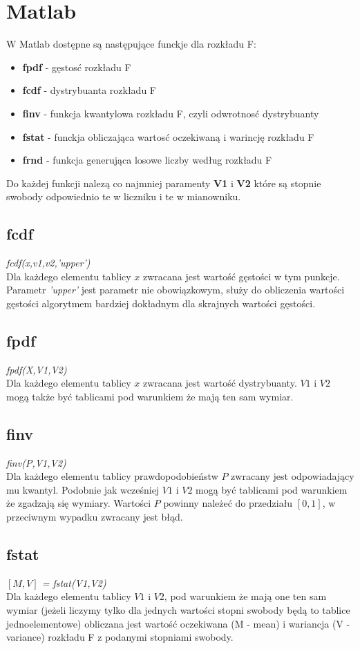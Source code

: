 \documentclass{article}
\begin{document}
{\newpage
\section{Matlab}
W Matlab dostępne są następujące funckje dla rozkładu F:
\begin{itemize}
\item \textbf{fpdf} - gęstosć rozkładu F
\item \textbf{fcdf} - dystrybuanta rozkładu F
\item \textbf{finv} - funkcja kwantylowa rozkładu F, czyli odwrotnosć dystrybuanty
\item \textbf{fstat} - funckja obliczająca wartosć oczekiwaną i warincję rozkładu F
\item \textbf{frnd} - funkcja generująca losowe liczby według rozkładu F
\end{itemize}
Do każdej funkcji nalezą co najmniej paramenty \textbf{V1} i \textbf{V2} które są stopnie swobody odpowiednio te w liczniku i te w mianowniku.
\subsection{fcdf}
\textit{fcdf(x,v1,v2,'upper')} \\
Dla każdego elementu tablicy $x$ zwracana jest wartość gęstości w tym punkcje. Parametr \textit{'upper'} jest parametr nie obowiązkowym, służy do obliczenia wartości gęstości algorytmem bardziej dokładnym dla skrajnych wartości gęstości.

\subsection{fpdf}
\textit{fpdf(X,V1,V2)}\\
Dla każdego elementu tablicy $x$ zwracana jest wartość dystrybuanty. $V1$ i $V2$ mogą także być tablicami pod warunkiem że mają ten sam wymiar.

\subsection{finv}
\textit{finv(P,V1,V2)} \\
Dla każdego elementu tablicy prawdopodobieństw $P$ zwracany jest odpowiadający mu kwantyl. Podobnie jak wcześniej $V1$ i $V2$ mogą być tablicami pod warunkiem że zgadzają się wymiary. Wartości $P$ powinny należeć do przedziału $[0,1]$, w przeciwnym wypadku zwracany jest błąd.

\subsection{fstat}
\textit{ $[M,V]$ = fstat(V1,V2)} \\
Dla każdego elementu tablicy $V1$ i $V2$, pod warunkiem że mają one ten sam wymiar (jeżeli liczymy tylko dla jednych wartości stopni swobody będą to tablice jednoelementowe) obliczana jest wartość oczekiwana (M - mean) i wariancja (V - variance) rozkładu F z podanymi stopniami swobody.

}
\end{document}
